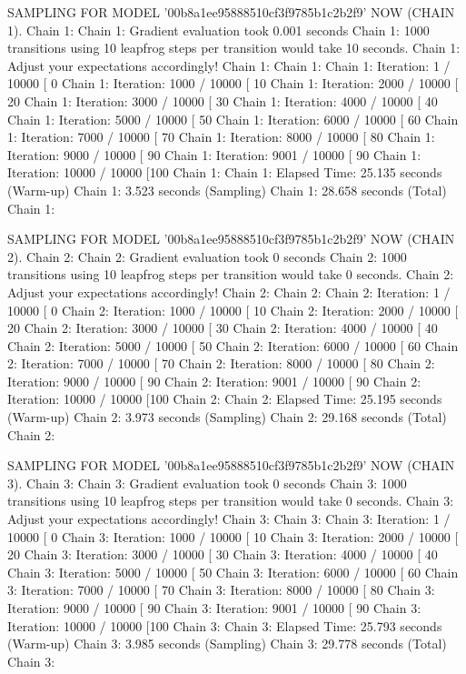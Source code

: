 \documentclass[
]{jss}
\begin{document}
\begin{CodeChunk}
\begin{CodeOutput}
SAMPLING FOR MODEL '00b8a1ee95888510cf3f9785b1c2b2f9' NOW (CHAIN 1).
Chain 1: 
Chain 1: Gradient evaluation took 0.001 seconds
Chain 1: 1000 transitions using 10 leapfrog steps per transition would take 10 seconds.
Chain 1: Adjust your expectations accordingly!
Chain 1: 
Chain 1: 
Chain 1: Iteration:    1 / 10000 [  0%
Chain 1: Iteration: 1000 / 10000 [ 10%
Chain 1: Iteration: 2000 / 10000 [ 20%
Chain 1: Iteration: 3000 / 10000 [ 30%
Chain 1: Iteration: 4000 / 10000 [ 40%
Chain 1: Iteration: 5000 / 10000 [ 50%
Chain 1: Iteration: 6000 / 10000 [ 60%
Chain 1: Iteration: 7000 / 10000 [ 70%
Chain 1: Iteration: 8000 / 10000 [ 80%
Chain 1: Iteration: 9000 / 10000 [ 90%
Chain 1: Iteration: 9001 / 10000 [ 90%
Chain 1: Iteration: 10000 / 10000 [100%
Chain 1: 
Chain 1:  Elapsed Time: 25.135 seconds (Warm-up)
Chain 1:                3.523 seconds (Sampling)
Chain 1:                28.658 seconds (Total)
Chain 1: 

SAMPLING FOR MODEL '00b8a1ee95888510cf3f9785b1c2b2f9' NOW (CHAIN 2).
Chain 2: 
Chain 2: Gradient evaluation took 0 seconds
Chain 2: 1000 transitions using 10 leapfrog steps per transition would take 0 seconds.
Chain 2: Adjust your expectations accordingly!
Chain 2: 
Chain 2: 
Chain 2: Iteration:    1 / 10000 [  0%
Chain 2: Iteration: 1000 / 10000 [ 10%
Chain 2: Iteration: 2000 / 10000 [ 20%
Chain 2: Iteration: 3000 / 10000 [ 30%
Chain 2: Iteration: 4000 / 10000 [ 40%
Chain 2: Iteration: 5000 / 10000 [ 50%
Chain 2: Iteration: 6000 / 10000 [ 60%
Chain 2: Iteration: 7000 / 10000 [ 70%
Chain 2: Iteration: 8000 / 10000 [ 80%
Chain 2: Iteration: 9000 / 10000 [ 90%
Chain 2: Iteration: 9001 / 10000 [ 90%
Chain 2: Iteration: 10000 / 10000 [100%
Chain 2: 
Chain 2:  Elapsed Time: 25.195 seconds (Warm-up)
Chain 2:                3.973 seconds (Sampling)
Chain 2:                29.168 seconds (Total)
Chain 2: 

SAMPLING FOR MODEL '00b8a1ee95888510cf3f9785b1c2b2f9' NOW (CHAIN 3).
Chain 3: 
Chain 3: Gradient evaluation took 0 seconds
Chain 3: 1000 transitions using 10 leapfrog steps per transition would take 0 seconds.
Chain 3: Adjust your expectations accordingly!
Chain 3: 
Chain 3: 
Chain 3: Iteration:    1 / 10000 [  0%
Chain 3: Iteration: 1000 / 10000 [ 10%
Chain 3: Iteration: 2000 / 10000 [ 20%
Chain 3: Iteration: 3000 / 10000 [ 30%
Chain 3: Iteration: 4000 / 10000 [ 40%
Chain 3: Iteration: 5000 / 10000 [ 50%
Chain 3: Iteration: 6000 / 10000 [ 60%
Chain 3: Iteration: 7000 / 10000 [ 70%
Chain 3: Iteration: 8000 / 10000 [ 80%
Chain 3: Iteration: 9000 / 10000 [ 90%
Chain 3: Iteration: 9001 / 10000 [ 90%
Chain 3: Iteration: 10000 / 10000 [100%
Chain 3: 
Chain 3:  Elapsed Time: 25.793 seconds (Warm-up)
Chain 3:                3.985 seconds (Sampling)
Chain 3:                29.778 seconds (Total)
Chain 3: 


\end{CodeOutput}
\end{CodeChunk}
\end{document}
